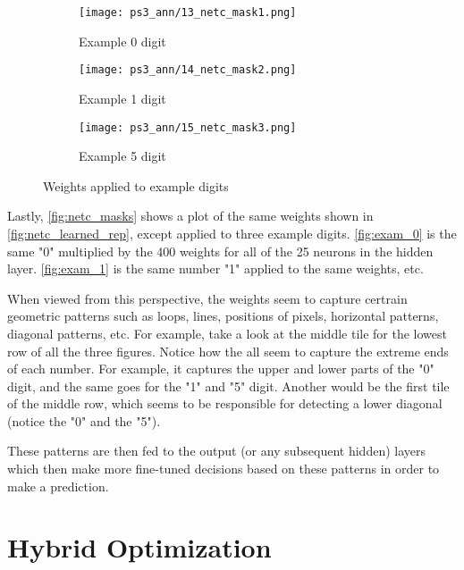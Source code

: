\documentclass{article} %
\theoremstyle{definition}
\theoremstyle{remark}
\theoremstyle{plain}
\begin{document}
\begin{figure}[h!]
\centering
    \begin{subfigure}{.33\textwidth}
        \centering
        \texttt{[image: ps3\_ann/13\_netc\_mask1.png]}
        \caption{Example 0 digit}
        \label{fig:exam_0}
    \end{subfigure}%
    \begin{subfigure}{.33\textwidth}
        \centering
        \texttt{[image: ps3\_ann/14\_netc\_mask2.png]}
        \caption{Example 1 digit}
        \label{fig:exam_1}
    \end{subfigure}%
    \begin{subfigure}{.33\textwidth}
        \centering
        \texttt{[image: ps3\_ann/15\_netc\_mask3.png]}
        \caption{Example 5 digit}
        \label{fig:exam_2}
    \end{subfigure}%
\caption{Weights applied to example digits}
\label{fig:netc_masks}
\end{figure}

Lastly, \autoref{fig:netc_masks} shows a plot of the same weights shown in \autoref{fig:netc_learned_rep}, except applied to three example digits. \autoref{fig:exam_0} is the same "0" multiplied by the 400 weights for all of the 25 neurons in the hidden layer. \autoref{fig:exam_1} is the same number "1" applied to the same weights, etc.

When viewed from this perspective, the weights seem to capture certrain geometric patterns such as loops, lines, positions of pixels, horizontal patterns, diagonal patterns, etc. For example, take a look at the middle tile for the lowest row of all the three figures. Notice how the all seem to capture the extreme ends of each number. For example, it captures the upper and lower parts of the "0" digit, and the same goes for the "1" and "5" digit. Another would be the first tile of the middle row, which seems to be responsible for detecting a lower diagonal (notice the "0" and the "5").

These patterns are then fed to the output (or any subsequent hidden) layers which then make more fine-tuned decisions based on these patterns in order to make a prediction.





\pagebreak

\section{Hybrid Optimization}
\end{document}
